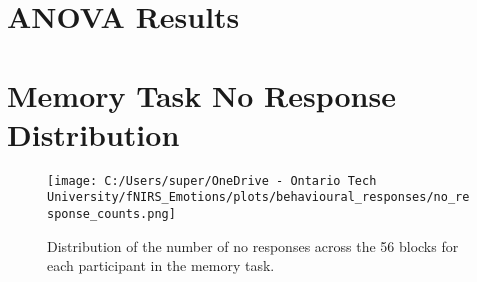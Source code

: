 \section{ANOVA Results}
\label{tab:appendix_memory_task_anova}


\section{Memory Task No Response Distribution}
\begin{figure}[H]
    \centering
    \texttt{[image: C:/Users/super/OneDrive - Ontario Tech University/fNIRS\_Emotions/plots/behavioural\_responses/no\_response\_counts.png]}
    \caption[Memory Task No Response Distribution]{Distribution of the number of no responses across the 56 blocks for each participant in the memory task.}
    \label{fig:appendix_memory_task_no_response_distribution}
\end{figure}